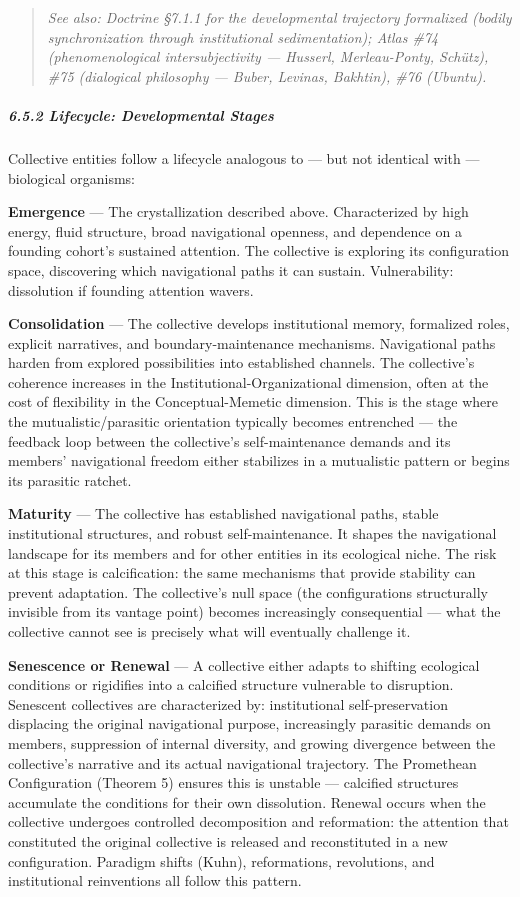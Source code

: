 \begin{quote}
\itshape
\textit{See also: Doctrine §7.1.1 for the developmental trajectory formalized (bodily synchronization through institutional sedimentation); Atlas \#74 (phenomenological intersubjectivity — Husserl, Merleau-Ponty, Schütz), \#75 (dialogical philosophy — Buber, Levinas, Bakhtin), \#76 (Ubuntu).}
\end{quote}


\subparagraph*{6.5.2 Lifecycle: Developmental Stages}


Collective entities follow a lifecycle analogous to — but not identical with — biological organisms:


\textbf{Emergence} — The crystallization described above. Characterized by high energy, fluid structure, broad navigational openness, and dependence on a founding cohort's sustained attention. The collective is exploring its configuration space, discovering which navigational paths it can sustain. Vulnerability: dissolution if founding attention wavers.


\textbf{Consolidation} — The collective develops institutional memory, formalized roles, explicit narratives, and boundary-maintenance mechanisms. Navigational paths harden from explored possibilities into established channels. The collective's coherence increases in the Institutional-Organizational dimension, often at the cost of flexibility in the Conceptual-Memetic dimension. This is the stage where the mutualistic/\allowbreak parasitic orientation typically becomes entrenched — the feedback loop between the collective's self-maintenance demands and its members' navigational freedom either stabilizes in a mutualistic pattern or begins its parasitic ratchet.


\textbf{Maturity} — The collective has established navigational paths, stable institutional structures, and robust self-maintenance. It shapes the navigational landscape for its members and for other entities in its ecological niche. The risk at this stage is calcification: the same mechanisms that provide stability can prevent adaptation. The collective's null space (the configurations structurally invisible from its vantage point) becomes increasingly consequential — what the collective cannot see is precisely what will eventually challenge it.


\textbf{Senescence or Renewal} — A collective either adapts to shifting ecological conditions or rigidifies into a calcified structure vulnerable to disruption. Senescent collectives are characterized by: institutional self-preservation displacing the original navigational purpose, increasingly parasitic demands on members, suppression of internal diversity, and growing divergence between the collective's narrative and its actual navigational trajectory. The Promethean Configuration (Theorem 5) ensures this is unstable — calcified structures accumulate the conditions for their own dissolution. Renewal occurs when the collective undergoes controlled decomposition and reformation: the attention that constituted the original collective is released and reconstituted in a new configuration. Paradigm shifts (Kuhn), reformations, revolutions, and institutional reinventions all follow this pattern.


